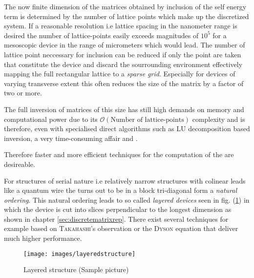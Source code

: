 The now finite dimension of the matrices obtained by inclusion of the self energy term is determined by the number of lattice points which make up the discretized system.
If a reasonable resolution i.e lattice spacing in the nanometer range is desired the number of lattice-points easily exceeds magnitudes of $10^5$ for a mesoscopic device in the range of micrometers which would lead. 
The number of lattice point neccessary for inclusion can be reduced if only the point are taken that constitute the device and discard the sourrounding environment effectively mapping the full rectangular lattice to a \emph{sparse grid}. Especially for devices of varying transverse extent this often reduces the size of the matrix by a factor of two or more.\par
The full inversion of matrices of this size has still high demands on memory and computational power due to its $\mathcal{O}(\text{Number of lattice-points})$ complexity and is therefore, even with specialised direct algorithms such as LU decomposition based inversion, a very time-consuming affair\cite{Datta2000.2.53} and \cite{Li2009Thesis}.\par
Therefore faster and more efficient techniques for the computation of the \gfnc{} are desireable.\par
For structures of serial nature i.e relatively narrow structures with colinear leads like a quantum wire the \hamil{} turns out to be in a block tri-diagonal form a \emph{natural ordering}. This natural ordering leads to so called \emph{layered devices} seen in fig. (\ref{fig:layered}) in which the device is cut into slices perpendicular to the longest dimension as shown in chapter \ref{sec:discretematrixrep}. There exist several techniques for example based on \textsc{Takahashi}'s observation \cite{Takahashi1973} or the \textsc{Dyson} equation that deliver much higher performance.
\begin{figure}[h!]
\centering
\texttt{[image: images/layeredstructure]}
\caption{Layered structure (Sample picture)}
\label{fig:layered}
\end{figure}
